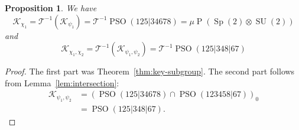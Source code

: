 \documentclass[reqno]{amsart}
\newtheorem{proposition}[theorem]{Proposition}
\theoremstyle{definition} \newtheorem{example}[theorem]{Example}
\newcommand{\SU}{\operatorname{SU}}
\newcommand{\PSO}{\operatorname{PSO}}
\newcommand{\Sp}{\operatorname{Sp}}
\renewcommand{\P}{\operatorname{P}}
\newcommand{\K}{\mathcal{K}}
\newcommand{\T}{\mathcal{T}}
\begin{document}
\begin{proposition} \label{prop:K12}
We have
\begin{equation*}
\K_{\chi_1} = \T^{-1}(\K_{\psi_1}) = \T^{-1}\PSO(125|34678) = \mu\P(\Sp(2) \otimes \SU(2))
\end{equation*}
and 
\begin{equation*}
\K_{\chi_1,\chi_2} = \T^{-1}(\K_{\psi_1,\psi_2}) = \T^{-1}\PSO(125|348|67)
\end{equation*}
\end{proposition}

\begin{proof}
The first part was Theorem~\ref{thm:key-subgroup}. The second part follows from Lemma~\ref{lem:intersection}:
\begin{align*}
\K_{\psi_1,\psi_2} &= (\PSO(125|34678) \cap \PSO(123458|67))_0\\
&= \PSO(125|348|67).
\end{align*}
\end{proof}
\end{document}
